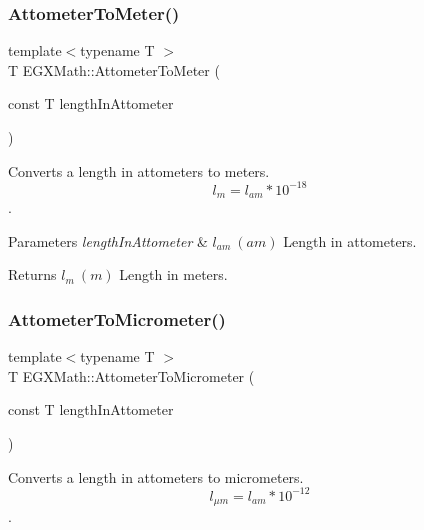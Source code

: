 \subsubsection{\texorpdfstring{Attometer\+To\+Meter()}{AttometerToMeter()}}
{\footnotesize\ttfamily template$<$typename T $>$ \\
T E\+G\+X\+Math\+::\+Attometer\+To\+Meter (\begin{DoxyParamCaption}\item[{const T}]{length\+In\+Attometer }\end{DoxyParamCaption})}



Converts a length in attometers to meters. \[ l_{m}=l_{am}* 10^{-18} \]. 


\begin{DoxyParams}{Parameters}
{\em length\+In\+Attometer} & $ l_{am}\ (am)$ Length in attometers. \\
\hline
\end{DoxyParams}
\begin{DoxyReturn}{Returns}
$ l_{m}\ (m)$ Length in meters. 
\end{DoxyReturn}
\mbox{\label{group___e_g_x_math-_conversions-_length_conversions-_s_i-_attometer-_s_i_gaa98a14657ea865a6cac8fb8fc42172a2}} 
\subsubsection{\texorpdfstring{Attometer\+To\+Micrometer()}{AttometerToMicrometer()}}
{\footnotesize\ttfamily template$<$typename T $>$ \\
T E\+G\+X\+Math\+::\+Attometer\+To\+Micrometer (\begin{DoxyParamCaption}\item[{const T}]{length\+In\+Attometer }\end{DoxyParamCaption})}



Converts a length in attometers to micrometers. \[ l_{\mu m}=l_{am} * 10^{-12} \]. 

